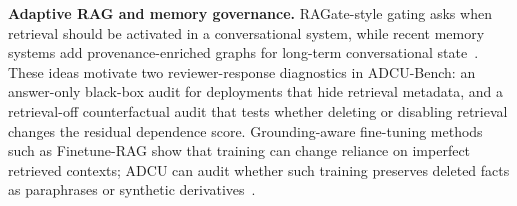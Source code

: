 \textbf{Adaptive RAG and memory governance.}
RAGate-style gating asks when retrieval should be activated in a conversational system, while recent memory systems add provenance-enriched graphs for long-term conversational state~\cite{wang2024ragate,pham2026memorai}. These ideas motivate two reviewer-response diagnostics in ADCU-Bench: an answer-only black-box audit for deployments that hide retrieval metadata, and a retrieval-off counterfactual audit that tests whether deleting or disabling retrieval changes the residual dependence score. Grounding-aware fine-tuning methods such as Finetune-RAG show that training can change reliance on imperfect retrieved contexts; ADCU can audit whether such training preserves deleted facts as paraphrases or synthetic derivatives~\cite{lee2025finetunerag}.
